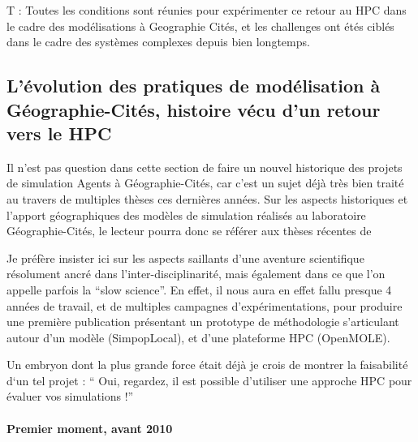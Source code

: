 T : Toutes les conditions sont réunies pour expérimenter ce retour au HPC dans le cadre des modélisations à Geographie Cités, et les challenges ont étés ciblés dans le cadre des systèmes complexes depuis bien longtemps.

\subsection{L'évolution des pratiques de modélisation à Géographie-Cités, histoire vécu d'un retour vers le HPC}
\label{ssec:hist_pratiques}


Il n'est pas question dans cette section de faire un nouvel historique des projets de simulation Agents à Géographie-Cités, car c'est un sujet déjà très bien traité au travers de multiples thèses ces dernières années. Sur les aspects historiques et l'apport géographiques des modèles de simulation réalisés au laboratoire Géographie-Cités, le lecteur pourra donc se référer aux thèses récentes de \autocites{Glisse2007, Louail2010, Schmitt2014, Cottineau2014b}

Je préfère insister ici sur les aspects saillants d'une aventure scientifique résolument ancré dans l'inter-disciplinarité, mais également dans ce que l'on appelle parfois la \foreignquote{english}{slow science}. En effet, il nous aura en effet fallu presque 4 années de travail, et de multiples campagnes d'expérimentations, pour produire une première publication \autocite{Schmitt2015} présentant un prototype de méthodologie s'articulant autour d'un modèle (SimpopLocal), et d'une plateforme HPC (OpenMOLE).

Un embryon dont la plus grande force était déjà je crois de montrer la faisabilité d`un tel projet : \enquote{ Oui, regardez, il est possible d'utiliser une approche HPC pour évaluer vos simulations !}


\paragraph{Premier moment, avant 2010}

